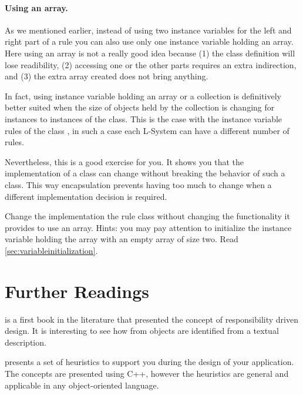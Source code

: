 \paragraph{Using an array.} As we mentioned earlier, instead of using two instance variables for the left and right part of a rule you can also use only one instance variable holding an array. Here using an array is not a really good
idea because (1) the class definition will lose readibility, (2)
accessing one or the other parts requires an extra indirection, and
(3) the extra array created does not bring anything.

In fact, using instance variable holding an array or a collection is
definitively better suited when the size of objects held by the
collection is changing for instances to instances of the class.  This
is the case with the instance variable rules of the class
, in such a case each L-System can have a different number
of rules.

Nevertheless, this is a good exercise for you. It shows you that the
implementation of a class can change without breaking the behavior of
such a class. This way encapsulation prevents having too much to
change when a different implementation decision is required.

Change the implementation the rule class without changing the
functionality it provides to use an array. Hints: you may pay
attention to initialize the instance variable holding the array with
an empty array of size two. Read \ref{sec:variableinitialization}.

\section{Further Readings}

\begin{description}
\item \cite{Wirf90} is a first book in the literature that presented 
the concept of responsibility driven design. It is interesting to see how from 
objects are identified from a textual description. 

\item \cite{Riel96} presents a set of heuristics to support you during the design of your application. The concepts are presented using C++, however the
heuristics are general and applicable in any object-oriented language.
\end{description}


\ifx\wholebook\relax\else\fi
